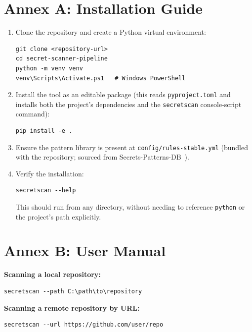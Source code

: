 \documentclass[12pt]{article}
\begin{document}
\newpage

\section*{Annex A: Installation Guide}

\begin{enumerate}
    \item Clone the repository and create a Python virtual environment:
    \begin{verbatim}
git clone <repository-url>
cd secret-scanner-pipeline
python -m venv venv
venv\Scripts\Activate.ps1   # Windows PowerShell
    \end{verbatim}
    \item Install the tool as an editable package (this reads \texttt{pyproject.toml} and installs both the project's dependencies and the \texttt{secretscan} console-script command):
    \begin{verbatim}
pip install -e .
    \end{verbatim}
    \item Ensure the pattern library is present at \texttt{config/rules-stable.yml} (bundled with the repository; sourced from Secrets-Patterns-DB~\cite{secretspatternsdb}).
    \item Verify the installation:
    \begin{verbatim}
secretscan --help
    \end{verbatim}
    This should run from any directory, without needing to reference \texttt{python} or the project's path explicitly.
\end{enumerate}

\newpage

\section*{Annex B: User Manual}

\textbf{Scanning a local repository:}
\begin{verbatim}
secretscan --path C:\path\to\repository
\end{verbatim}

\textbf{Scanning a remote repository by URL:}
\begin{verbatim}
secretscan --url https://github.com/user/repo
\end{verbatim}
\end{document}
